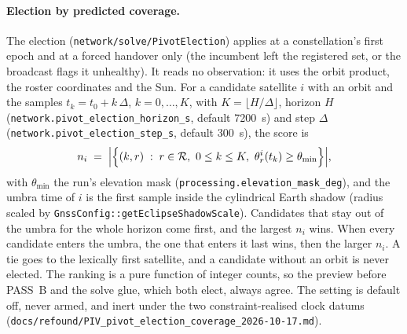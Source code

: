 \documentclass[main.tex]{subfiles}
\begin{document}
\paragraph{Election by predicted coverage.}
The election (\texttt{network/solve/PivotElection}) applies at a
constellation's first epoch and at a forced handover only (the incumbent
left the registered set, or the broadcast flags it unhealthy). It reads
no observation: it uses the orbit product, the roster coordinates and the
Sun. For a candidate satellite $i$ with an orbit and the samples
$t_k = t_0 + k\,\Delta$, $k = 0,\dots,K$, with
$K = \lfloor H/\Delta\rfloor$, horizon $H$
(\texttt{network.pivot\_election\_horizon\_s}, default
\SI{7200}{\second}) and step $\Delta$
(\texttt{network.pivot\_election\_step\_s}, default \SI{300}{\second}),
the score is
\begin{equation}
n_i \;=\; \Big|\Big\{(k,r) \;:\; r\in\mathcal{R},\ 0\le k\le K,\
          \theta^i_r(t_k) \ge \theta_{\min}\Big\}\Big|,
\label{eq:net-pivot-score}
\end{equation}
with $\theta_{\min}$ the run's elevation mask
(\texttt{processing.elevation\_mask\_deg}), and the umbra time of $i$
is the first sample inside the cylindrical Earth shadow (radius scaled
by \texttt{GnssConfig::getEclipseShadowScale}). Candidates that stay out
of the umbra for the whole horizon come first, and the largest $n_i$
wins. When every candidate enters the umbra, the one that enters it last
wins, then the larger $n_i$. A tie goes to the lexically first
satellite, and a candidate without an orbit is never elected. The
ranking is a pure function of integer counts, so the preview before
PASS~B and the solve glue, which both elect, always agree. The setting
is default off, never armed, and inert under the two constraint-realised
clock datums
(\texttt{docs/refound/PIV\_pivot\_election\_coverage\_2026-10-17.md}).
\end{document}
